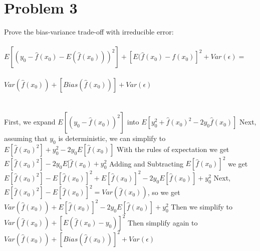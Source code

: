 \documentclass[11pt,a4paper,twoside,openright]{report}
\begin{document}
	
	
	\newpage
	\section*{Problem 3}
	
	Prove the bias-variance trade-off with irreducible error:\\\\
	
	
	
	$E[(y_{0} - \hat{f}(x_{0}) - E(\hat{f}(x_{0})))^2] + [E(\hat{f}(x_{0}) - f(x_{0})]^2 + Var(\epsilon) =$\\\\
	
	$Var(\hat{f}(x_{0})) + [Bias(\hat{f}(x_{0}))] + Var(\epsilon)$\\
	\\\\
	
	
	
	
	\noindent First, we expand $E[(y_{0} - \hat{f}(x_{0}))^2]$ into $E[y_{0}^2 + \hat{f}(x_{0})^2 - 2y_{0}\hat{f}(x_{0})]$\newline
    	\newline
  	Next, assuming that $y_{0}$ is deterministic, we can simplify to $E[\hat{f}(x_{0})^2] + y_{0}^2 - 2y_{0}E[\hat{f}(x_{0})]$\newline
    	\newline
    	With the rules of expectation we get $E[\hat{f}(x_{0})^2] - 2y_{0}E[\hat{f}(x_{0}) + y_{0}^2$\newline
    	\newline
    	Adding and Subtracting $E[\hat{f}(x_{0})]^2$ we get\\
    	
	$E[\hat{f}(x_{0})^2] - E[\hat{f}(x_{0})]^2 + E[\hat{f}(x_{0})]^2  - 2y_{0}E[\hat{f}(x_{0})] + y_{0}^2$\newline
    	\newline
   	Next, $E[\hat{f}(x_{0})^2] - E[\hat{f}(x_{0})]^2 = Var(\hat{f}(x_{0}))$, so we get\newline 
    	\newline
    	$Var(\hat{f}(x_{0})) + E[\hat{f}(x_{0})]^2  - 2y_{0}E[\hat{f}(x_{0})] + y_{0}^2$\newline
    	\newline
    	Then we simplify to $Var(\hat{f}(x_{0})) + [E(\hat{f}(x_{0}) - y_{0})]^2$\newline
    	\newline
    	Then simplify again to $Var(\hat{f}(x_{0})) + [Bias(\hat{f}(x_{0}))]^2 + Var(\epsilon)$
	
\end{document}
